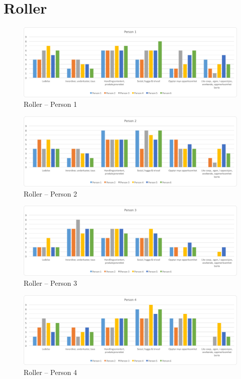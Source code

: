 \chapter{Roller}
\label{ch:roller}

\begin{figure}[!ht]
\centering
\includegraphics[width=1\textwidth]{gfx/roller_person1.png}
\caption{Roller – Person 1}
\label{roller_person1}
\end{figure}

\begin{figure}[!ht]
\centering
\includegraphics[width=1\textwidth]{gfx/roller_person2.png}
\caption{Roller – Person 2}
\label{roller_person2}
\end{figure}

\begin{figure}[!ht]
\centering
\includegraphics[width=1\textwidth]{gfx/roller_person3.png}
\caption{Roller – Person 3}
\label{roller_person3}
\end{figure}

\begin{figure}[!ht]
\centering
\includegraphics[width=1\textwidth]{gfx/roller_person4.png}
\caption{Roller – Person 4}
\label{roller_person4}
\end{figure}

